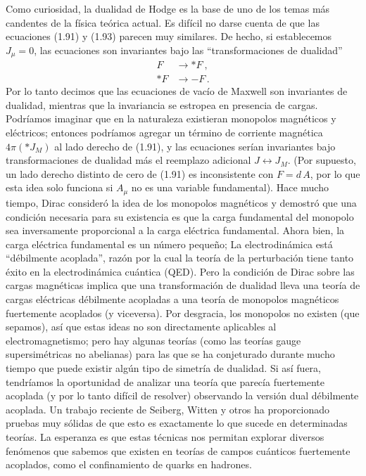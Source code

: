 \documentclass[11pt,b5paper,openany,twoside]{book}
\begin{document}
Como curiosidad, la dualidad de Hodge es la base de uno de los temas más candentes de la física teórica actual.
Es difícil no darse cuenta de que las ecuaciones (1.91) y (1.93) parecen muy similares.
De hecho, si establecemos $J_\mu=0$, las ecuaciones son invariantes bajo las ``transformaciones de dualidad''
\begin{align}
F &\rightarrow \ast F\ ,\nonumber \\
\ast F &\rightarrow -F\,. \label{1.94}
\end{align}
Por lo tanto decimos que las ecuaciones de vacío de Maxwell son invariantes de dualidad, mientras que la invariancia se estropea en presencia de cargas.
Podríamos imaginar que en la naturaleza existieran monopolos magnéticos y eléctricos; entonces podríamos agregar un término de corriente magnética $4\pi(*J_M)$ al lado derecho de (1.91), y las ecuaciones serían invariantes bajo transformaciones de dualidad más el reemplazo adicional $J \leftrightarrow J_M$.
(Por supuesto, un lado derecho distinto de cero de (1.91) es inconsistente con $F= d\,A$, por lo que esta idea solo funciona si $A_\mu$ no es una variable fundamental).
Hace mucho tiempo, Dirac consideró la idea de los monopolos magnéticos y demostró que una condición necesaria para su existencia es que la carga fundamental del monopolo sea inversamente proporcional a la carga eléctrica fundamental.
Ahora bien, la carga eléctrica fundamental es un número pequeño; La electrodinámica está ``débilmente acoplada'', razón por la cual la teoría de la perturbación tiene tanto éxito en la electrodinámica cuántica (QED).
Pero la condición de Dirac sobre las cargas magnéticas implica que una transformación de dualidad lleva una teoría de cargas eléctricas débilmente acopladas a una teoría de monopolos magnéticos fuertemente acoplados (y viceversa).
Por desgracia, los monopolos no existen (que sepamos), así que estas ideas no son directamente aplicables al electromagnetismo; pero hay algunas teorías (como las teorías gauge supersimétricas no abelianas) para las que se ha conjeturado durante mucho tiempo que puede existir algún tipo de simetría de dualidad.
Si así fuera, tendríamos la oportunidad de analizar una teoría que parecía fuertemente acoplada (y por lo tanto difícil de resolver) observando la versión dual débilmente acoplada.
Un trabajo reciente de Seiberg, Witten y otros ha proporcionado pruebas muy sólidas de que esto es exactamente lo que sucede en determinadas teorías.
La esperanza es que estas técnicas nos permitan explorar diversos fenómenos que sabemos que existen en teorías de campos cuánticos fuertemente acoplados, como el confinamiento de quarks en hadrones.
\end{document}
